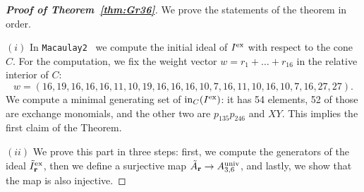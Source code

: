 \documentclass[10pt,a4paper]{amsart}
\numberwithin{equation}{section}
\DeclareMathOperator{\init}{in}
\begin{document}
\begin{proof}[{\bf Proof of Theorem~\ref{thm:Gr36}}]
We prove the statements of the theorem in order.

 $(i)$ In \texttt{Macaulay2}~\cite{M2} we compute the initial ideal of $I^{\rm ex}$ with respect to the cone $C$.
 For the computation, we fix the weight vector $w=r_1+\dots+r_{16}$ in the relative interior of $C$:
 \begin{displaymath}
 w= (16, 19, 16, 16, 16, 11, 10, 19, 16, 16, 16, 10, 7, 16, 11, 10, 16, 10, 7, 16, 27, 27).
 \end{displaymath}
 We compute a minimal generating set of $\init_C(I^{\rm ex})$: it has 54 elements, 52 of those are exchange monomials, and the other two are $p_{135}p_{246}$ and $XY$.
 This implies the first claim of the Theorem.


$(ii)$ We prove this part in three steps: first, we compute the generators of the ideal $\tilde I_{\bf r}^{\rm ex}$, then we define a surjective map $\tilde A_{\bf r}\to A_{3,6}^{\rm univ}$, and lastly, we show that the map is also injective.


\end{proof}
\end{document}
